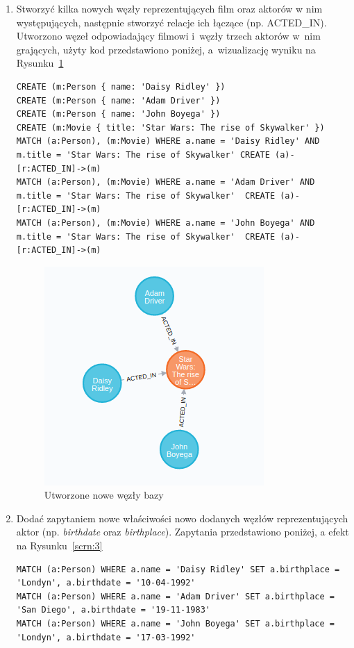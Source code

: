 \documentclass[a4paper,9pt]{extarticle}	%
\begin{document}
\begin{enumerate}
  \item Stworzyć kilka nowych węzły reprezentujących film oraz aktorów w nim występujących, następnie stworzyć relacje ich łączące (np. ACTED\_IN).
  Utworzono węzeł odpowiadający filmowi i~węzły trzech aktorów w~nim grających, użyty kod przedstawiono poniżej, a~wizualizację wyniku na Rysunku~\ref{scrn:2}
  \begin{lstlisting}
CREATE (m:Person { name: 'Daisy Ridley' })
CREATE (m:Person { name: 'Adam Driver' })
CREATE (m:Person { name: 'John Boyega' })
CREATE (m:Movie { title: 'Star Wars: The rise of Skywalker' })
MATCH (a:Person), (m:Movie) WHERE a.name = 'Daisy Ridley' AND m.title = 'Star Wars: The rise of Skywalker' CREATE (a)-[r:ACTED_IN]->(m)
MATCH (a:Person), (m:Movie) WHERE a.name = 'Adam Driver' AND m.title = 'Star Wars: The rise of Skywalker'  CREATE (a)-[r:ACTED_IN]->(m)
MATCH (a:Person), (m:Movie) WHERE a.name = 'John Boyega' AND m.title = 'Star Wars: The rise of Skywalker'  CREATE (a)-[r:ACTED_IN]->(m)
  \end{lstlisting}
  
  \begin{figure}[ht]
    \centering
    \includegraphics[scale=0.5]{screeny/2.png}
    \caption{Utworzone nowe węzły bazy}
    \label{scrn:2}
  \end{figure}
  
  \item Dodać zapytaniem nowe właściwości nowo dodanych węzłów reprezentujących aktor (np. \textit{birthdate}
oraz \textit{birthplace}). Zapytania przedstawiono poniżej, a efekt na Rysunku~\ref{scrn:3}
	\begin{lstlisting}
MATCH (a:Person) WHERE a.name = 'Daisy Ridley' SET a.birthplace = 'Londyn', a.birthdate = '10-04-1992'
MATCH (a:Person) WHERE a.name = 'Adam Driver' SET a.birthplace = 'San Diego', a.birthdate = '19-11-1983'
MATCH (a:Person) WHERE a.name = 'John Boyega' SET a.birthplace = 'Londyn', a.birthdate = '17-03-1992'
  \end{lstlisting}
  

\end{enumerate}
\end{document}
